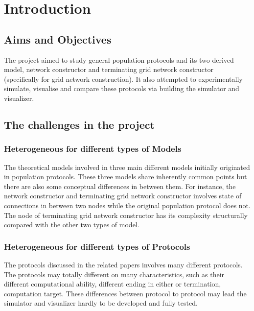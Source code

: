 \section{Introduction}
\subsection{Aims and Objectives}
\par\noindent
The project aimed to study general population protocols \cite{AspnesR2007} and
its two derived model,
network constructor \cite{MS16a} and terminating grid network constructor \cite{Mi17}
(specifically for grid network construction).
It also attempted to experimentally simulate, visualise and compare these protocols
via building the simulator and visualizer.

\subsection{The challenges in the project}
\subsubsection{Heterogeneous for different types of Models}
\par\noindent
The theoretical models involved in three main different models initially originated in
population protocols. These three models share inherently common points but there are also some
conceptual differences in between them. For instance, the network constructor \cite{MS16a} and terminating
grid network constructor \cite{Mi17}
involves state of connections in between two nodes while the original population protocol does not.
The node of terminating grid network constructor has its complexity structurally compared with
the other two types of model.

\subsubsection{Heterogeneous for different types of Protocols}
\par\noindent
The protocols discussed in the related papers \cite{AspnesR2007, MS16a, Mi17} involves
many different protocols. The protocols may totally different on many characteristics,
such as their different computational ability, different ending in either or termination,
computation target. These differences between
protocol to protocol may lead the simulator and visualizer hardly to be developed and
fully tested.

